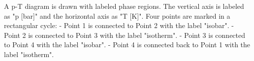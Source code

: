 A p-T diagram is drawn with labeled phase regions. The vertical axis is labeled as "p [bar]" and the horizontal axis as "T [K]". Four points are marked in a rectangular cycle:  
- Point 1 is connected to Point 2 with the label "isobar".  
- Point 2 is connected to Point 3 with the label "isotherm".  
- Point 3 is connected to Point 4 with the label "isobar".  
- Point 4 is connected back to Point 1 with the label "isotherm".